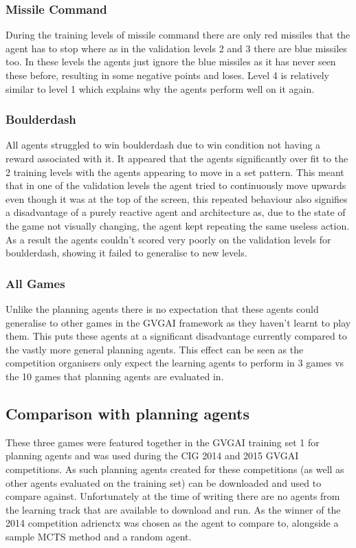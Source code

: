\subsubsection{Missile Command}
\label{sssec:qualMC}
During the training levels of missile command there are only red missiles that the agent has to stop where as in the validation levels 2 and 3 there are blue missiles too.
In these levels the agents just ignore the blue missiles as it has never seen these before, resulting in some negative points and loses.
Level 4 is relatively similar to level 1 which explains why the agents perform well on it again.
\subsubsection{Boulderdash}
All agents struggled to win boulderdash due to win condition not having a reward associated with it.
It appeared that the agents significantly over fit to the 2 training levels with the agents appearing to move in a set pattern.
This meant that in one of the validation levels the agent tried to continuously move upwards even though it was at the top of the screen, this repeated behaviour also signifies a disadvantage of a purely reactive agent and architecture as, due to the state of the game not visually changing, the agent kept repeating the same useless action.
As a result the agents couldn't scored very poorly on the validation levels for boulderdash, showing it failed to generalise to new levels.
\subsubsection{All Games}
Unlike the planning agents there is no expectation that these agents could generalise to other games in the GVGAI framework as they haven't learnt to play them.
This puts these agents at a significant disadvantage currently compared to the vastly more general planning agents.
This effect can be seen as the competition organisers only expect the learning agents to perform in 3 games vs the 10 games that planning agents are evaluated in.

\subsection{Comparison with planning agents}
These three games were featured together in the GVGAI training set 1 for planning agents\cite{GVGAITrainingSet1} and was used during the CIG 2014 and 2015 GVGAI competitions.
As such planning agents created for these competitions (as well as other agents evaluated on the training set) can be downloaded and used to compare against.
Unfortunately at the time of writing there are no agents from the learning track that are available to download and run.
As the winner of the 2014 competition adrienctx was chosen as the agent to compare to, alongside a sample MCTS method and a random agent.

